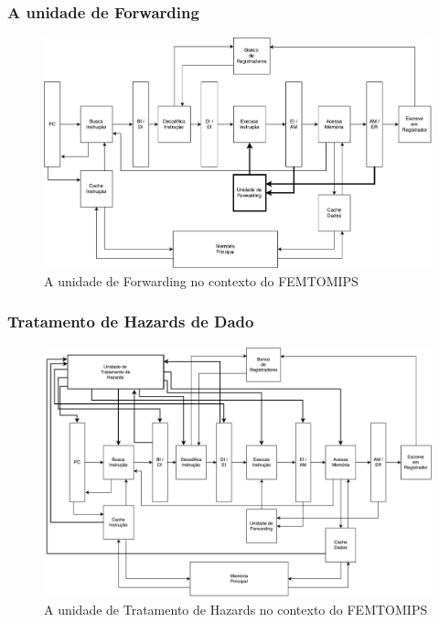 \documentclass[11pt,a4paper]{article}
\begin{document}
\subsubsection{A unidade de Forwarding}

	\begin{figure}[!ht]
  	\centering	
    \includegraphics[scale=0.50, angle=270]{FEMTOMIPS_GLOBAL_FORWARDING}
    \caption{A unidade de Forwarding no contexto do FEMTOMIPS}
	\end{figure}

	
\subsubsection{Tratamento de Hazards de Dado}

	\begin{figure}[!ht]
  	\centering	
    \includegraphics[scale=0.50, angle=270]{FEMTOMIPS_GLOBAL_HAZARDS}
    \caption{A unidade de Tratamento de Hazards no contexto do FEMTOMIPS}
	\end{figure}
	
\end{document}
